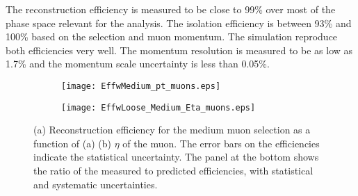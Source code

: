 The reconstruction efficiency is measured to be close to 99\% over most of the phase space relevant for the analysis. 
The isolation efficiency is between 93\% and 100\% based on the selection and muon momentum. The simulation reproduce both efficiencies very well.
The  momentum resolution is measured to be as low as 1.7\% and the momentum scale uncertainty is less than  0.05\%.

\begin{figure}[htb!]
\centering
\begin{subfigure}[t]{0.54\textwidth}
\texttt{[image: EffwMedium\_pt\_muons.eps]}
\subcaption{}
\label{fig:}
\end{subfigure}
\begin{subfigure}[t]{0.4\textwidth}
\texttt{[image: EffwLoose\_Medium\_Eta\_muons.eps]}
\subcaption{}
\label{fig:}
\end{subfigure}
\vspace{-0.25cm}
\caption{(a) Reconstruction efficiency for the medium muon selection as a function of (a) \pt (b) $\eta$ of the muon.
 The error bars on the efficiencies indicate the statistical uncertainty. The panel at the bottom shows the ratio of the measured to predicted efficiencies, with statistical and systematic uncertainties.
}
\label{fig:exp.reco.muon}
\end{figure} 


